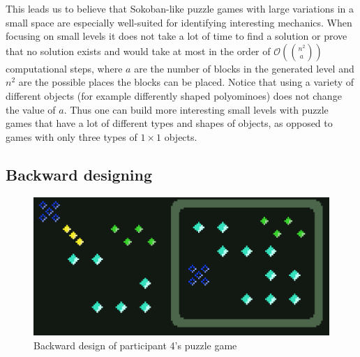 \begin{description}
This leads us to believe that Sokoban-like puzzle games with large variations in a small space are especially well-suited for identifying interesting mechanics. When focusing on small levels it does not take a lot of time to find a solution or prove that no solution exists and would take at most in the order of $\mathcal{O}\left( {n^2 \choose a} \right)$ computational steps, where $a$ are the number of blocks in the generated level and $n^2$ are the possible places the blocks can be placed. Notice that using a variety of different objects (for example differently shaped polyominoes) does not change the value of $a$. Thus one can build more interesting small levels with puzzle games that have a lot of different types and shapes of objects, as opposed to games with only three types of $1 \times 1$ objects. 



\end{description}

\subsection{Backward designing}

\begin{figure}
\centering
\includegraphics[width=.85\textwidth]{figures/backward_design_minotalen.png}
\caption{Backward design of participant 4's puzzle game\label{fig:backwarddesign}}
\end{figure}

